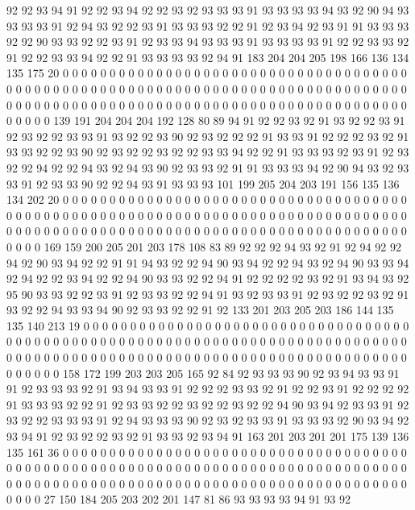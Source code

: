 92 92 93 94 91 92 92 93 94 92 92 93 92 93 93 93 91 93 93 93
93 94 93 92 90 94 93 93 93 93 91 92 94 93 92 92 93 91 93 93
93 92 92 91 92 93 94 92 93 91 91 93 93 93 92 92 90 93 93 92
92 93 91 92 93 93 94 93 93 93 91 93 93 93 93 91 92 92 93 93
92 91 92 92 93 93 94 92 92 91 93 93 93 93 92 94 91 183 204 204
205 198 166 136 134 135 175 20 0 0 0 0 0 0 0 0 0 0 0 0
0 0 0 0 0 0 0 0 0 0 0 0 0 0 0 0 0 0 0 0
0 0 0 0 0 0 0 0 0 0 0 0 0 0 0 0 0 0 0 0
0 0 0 0 0 0 0 0 0 0 0 0 0 0 0 0 0 0 0 0
0 0 0 0 0 0 0 0 0 0 0 0 0 0 0 0 0 0 0 0
0 0 0 0 0 0 0 0 0 0 0 0 0 0 0 0 0 0 0 0
0 0 0 0 0 0 0 0 0 0 0 0 0 0 0 0 139 191 204 204
204 192 128 80 89 94 91 92 92 93 92 91 93 92 92 93 91 92 93 92
92 93 93 91 93 92 92 93 90 92 93 92 92 92 91 93 93 91 92 92
92 93 92 91 93 93 92 92 93 90 92 93 92 92 93 92 92 93 93 94
92 92 91 93 93 93 92 93 91 92 93 92 92 94 92 92 94 93 92 94
93 90 92 93 93 92 91 91 93 93 93 94 92 90 94 93 92 93 93 91
92 93 93 90 92 92 94 93 91 93 93 93 101 199 205 204 203 191 156 135
136 134 202 20 0 0 0 0 0 0 0 0 0 0 0 0 0 0 0 0
0 0 0 0 0 0 0 0 0 0 0 0 0 0 0 0 0 0 0 0
0 0 0 0 0 0 0 0 0 0 0 0 0 0 0 0 0 0 0 0
0 0 0 0 0 0 0 0 0 0 0 0 0 0 0 0 0 0 0 0
0 0 0 0 0 0 0 0 0 0 0 0 0 0 0 0 0 0 0 0
0 0 0 0 0 0 0 0 0 0 0 0 0 0 0 0 0 0 0 0
0 0 0 0 0 0 0 0 0 0 0 169 159 200 205 201 203 178 108 83
89 92 92 92 94 93 92 91 92 94 92 92 94 92 90 93 94 92 92 91
91 94 93 92 92 94 90 93 94 92 92 94 93 92 94 90 93 93 94 92
94 92 92 93 94 92 92 94 90 93 93 92 92 94 91 92 92 92 92 93
92 91 93 94 93 92 95 90 93 93 92 92 93 91 92 93 93 92 92 94
91 93 92 93 93 91 92 93 92 92 93 92 91 93 92 92 94 93 93 94
90 92 93 93 92 92 91 92 133 201 203 205 203 186 144 135 135 140 213 19
0 0 0 0 0 0 0 0 0 0 0 0 0 0 0 0 0 0 0 0
0 0 0 0 0 0 0 0 0 0 0 0 0 0 0 0 0 0 0 0
0 0 0 0 0 0 0 0 0 0 0 0 0 0 0 0 0 0 0 0
0 0 0 0 0 0 0 0 0 0 0 0 0 0 0 0 0 0 0 0
0 0 0 0 0 0 0 0 0 0 0 0 0 0 0 0 0 0 0 0
0 0 0 0 0 0 0 0 0 0 0 0 0 0 0 0 0 0 0 0
0 0 0 0 0 0 0 158 172 199 203 203 205 165 92 84 92 93 93 93
90 92 93 94 93 93 91 91 92 93 93 93 92 91 93 94 93 93 91 92
92 92 93 93 92 91 92 92 93 91 92 92 92 92 91 93 93 93 92 92
91 92 93 93 92 92 93 92 92 93 92 92 94 90 93 94 92 93 93 91
92 93 92 92 93 93 93 91 92 94 93 93 93 90 92 93 92 93 93 91
93 93 93 92 90 93 94 92 93 94 91 92 93 92 92 93 92 91 93 93
92 93 94 91 163 201 203 201 201 175 139 136 135 161 36 0 0 0 0 0
0 0 0 0 0 0 0 0 0 0 0 0 0 0 0 0 0 0 0 0
0 0 0 0 0 0 0 0 0 0 0 0 0 0 0 0 0 0 0 0
0 0 0 0 0 0 0 0 0 0 0 0 0 0 0 0 0 0 0 0
0 0 0 0 0 0 0 0 0 0 0 0 0 0 0 0 0 0 0 0
0 0 0 0 0 0 0 0 0 0 0 0 0 0 0 0 0 0 0 0
0 0 0 0 0 0 0 0 0 0 0 0 0 0 0 0 0 0 0 0
0 0 27 150 184 205 203 202 201 147 81 86 93 93 93 93 94 91 93 92
